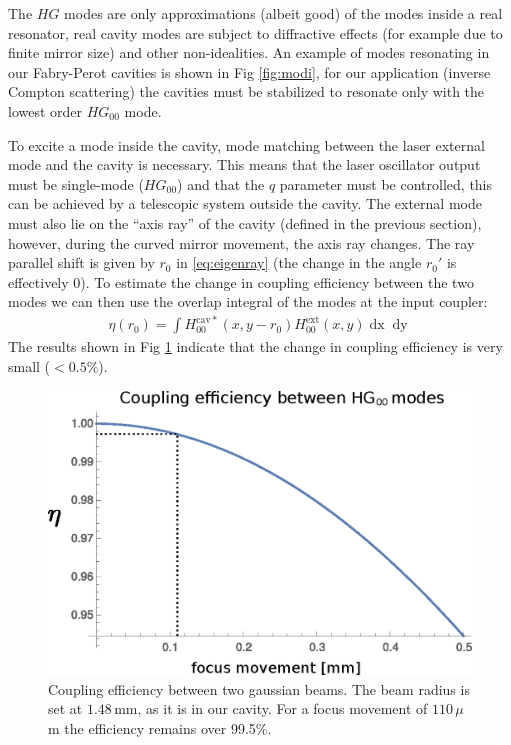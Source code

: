 The $HG$ modes are only approximations (albeit good) of the modes inside a real resonator, real cavity modes are subject to diffractive effects (for example due to finite mirror size) and other non-idealities. An example of modes resonating in our Fabry-Perot cavities is shown in Fig \ref{fig:modi}, for our application (inverse Compton scattering) the cavities must be stabilized to resonate only with the lowest order $HG_{00}$ mode.

To excite a mode inside the cavity, mode matching between the laser external mode and the cavity is necessary. This means that the laser oscillator output must be single-mode ($HG_{00}$) and that the $q$ parameter must be controlled, this can be achieved by a telescopic system outside the cavity. The external mode must also lie on the ``axis ray'' of the cavity (defined in the previous section), however, during the curved mirror movement, the axis ray changes. The ray parallel shift is given by $r_0$ in \ref{eq:eigenray} (the change in the angle $r_0'$ is effectively 0). To estimate the change in coupling efficiency between the two modes we can then use the overlap integral of the modes at the input coupler:
\begin{align}
	\eta(r_0) = \int H_{00}^\mathrm{cav*}(x,y-r_0)H_{00}^\mathrm{ext}(x,y)\mathop{dx}\mathop{dy} 
	\label{eq:eta}
\end{align} 
The results shown in Fig \ref{fig:couplingeta} indicate that the change in coupling efficiency is very small ($<0.5\%$).
\begin{figure}
	\centering
	\includegraphics[width=0.8\linewidth]{images/couplingeta.eps}
	\caption{Coupling efficiency between two gaussian beams. The beam radius is set at $1.48\,$mm, as it is in our cavity. For a focus movement of $110\,\mu$m the efficiency remains over 99.5\%.}
	\label{fig:couplingeta}
\end{figure}

